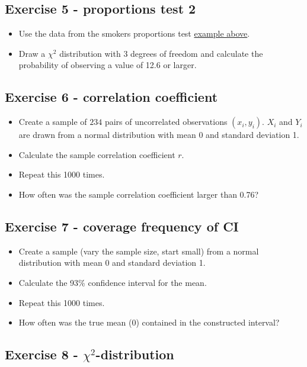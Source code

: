 \documentclass[
]{book}
\providecommand{\tightlist}{%
  \setlength{\itemsep}{0pt}\setlength{\parskip}{0pt}}
\begin{document}
\subsection{Exercise 5 - proportions test 2}\label{exercise5_nhst}

\begin{itemize}
\tightlist
\item
  Use the data from the smokers proportions test \hyperref[proportions_test_more_samples]{example above}.
\item
  Draw a \(\chi^2\) distribution with 3 degrees of freedom and calculate the
  probability of observing a value of 12.6 or larger.
\end{itemize}

\subsection{Exercise 6 - correlation coefficient}\label{exercise6_nhst}

\begin{itemize}
\tightlist
\item
  Create a sample of \(234\) pairs of uncorrelated observations \((x_i,y_i)\).
  \(X_i\) and \(Y_i\) are drawn from a normal distribution with mean 0 and standard deviation 1.
\item
  Calculate the sample correlation coefficient \(r\).
\item
  Repeat this 1000 times.
\item
  How often was the sample correlation coefficient larger than 0.76?
\end{itemize}

\subsection{Exercise 7 - coverage frequency of CI}\label{exercise7_nhst}

\begin{itemize}
\tightlist
\item
  Create a sample (vary the sample size, start small) from a normal distribution with mean 0 and standard deviation 1.
\item
  Calculate the 93\% confidence interval for the mean.
\item
  Repeat this 1000 times.
\item
  How often was the true mean (0) contained in the constructed interval?
\end{itemize}

\subsection{\texorpdfstring{Exercise 8 - \(\chi^2\)-distribution}{Exercise 8 - \textbackslash chi\^{}2-distribution}}\label{exercise8_nhst}
\end{document}
